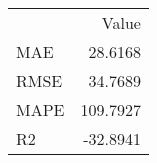 \begin{tabular}{lr}
 & Value \\
MAE & 28.6168 \\
RMSE & 34.7689 \\
MAPE & 109.7927 \\
R2 & -32.8941 \\
\end{tabular}
